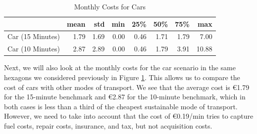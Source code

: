\begin{table}
  \caption{Monthly Costs for Cars}
  \label{tab:monthly_costs_for_cars}
  \begin{center}
    \begin{tabular}{|l|r|r|r|r|r|r|r|}
    \hline
     & mean & std & min & 25\% & 50\% & 75\% & max \\
    \hline
    Car (15 Minutes) & 1.79 & 1.69 & 0.00 & 0.46 & 1.71 & 1.79 & 7.00 \\
    \hline
    Car (10 Minutes) & 2.87 & 2.89 & 0.00 & 0.46 & 1.79 & 3.91 & 10.88 \\
    \hline
    \end{tabular}
  \end{center}
\end{table}

Next, we will also look at the monthly costs for the car scenario in the same hexagons we considered previously in Figure \ref{tab:monthly_costs_for_cars}.
This allows us to compare the cost of cars with other modes of transport.
We see that the average cost is \euro{1.79} for the 15-minute benchmark and \euro{2.87} for the 10-minute benchmark, which in both cases is less than a third of the cheapest sustainable mode of transport.
However, we need to take into account that the cost of \euro{0.19}/min tries to capture fuel costs, repair costs, insurance, and tax, but not acquisition costs.
